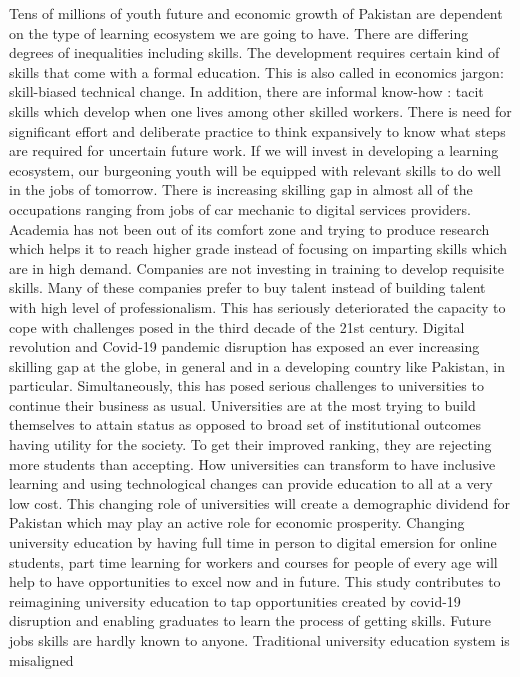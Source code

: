\documentclass[]{elsarticle} %
\begin{document}
Tens of millions of youth future and economic growth of Pakistan are
dependent on the type of learning ecosystem we are going to have. There
are differing degrees of inequalities including skills. The development
requires certain kind of skills that come with a formal education. This
is also called in economics jargon: skill-biased technical change. In
addition, there are informal know-how : tacit skills which develop when
one lives among other skilled workers. There is need for significant
effort and deliberate practice to think expansively to know what steps
are required for uncertain future work. If we will invest in developing
a learning ecosystem, our burgeoning youth will be equipped with
relevant skills to do well in the jobs of tomorrow. There is increasing
skilling gap in almost all of the occupations ranging from jobs of car
mechanic to digital services providers. Academia has not been out of its
comfort zone and trying to produce research which helps it to reach
higher grade instead of focusing on imparting skills which are in high
demand. Companies are not investing in training to develop requisite
skills. Many of these companies prefer to buy talent instead of building
talent with high level of professionalism. This has seriously
deteriorated the capacity to cope with challenges posed in the third
decade of the 21st century. Digital revolution and Covid-19 pandemic
disruption has exposed an ever increasing skilling gap at the globe, in
general and in a developing country like Pakistan, in particular.
Simultaneously, this has posed serious challenges to universities to
continue their business as usual. Universities are at the most trying to
build themselves to attain status as opposed to broad set of
institutional outcomes having utility for the society. To get their
improved ranking, they are rejecting more students than accepting. How
universities can transform to have inclusive learning and using
technological changes can provide education to all at a very low cost.
This changing role of universities will create a demographic dividend
for Pakistan which may play an active role for economic prosperity.
Changing university education by having full time in person to digital
emersion for online students, part time learning for workers and courses
for people of every age will help to have opportunities to excel now and
in future. This study contributes to reimagining university education to
tap opportunities created by covid-19 disruption and enabling graduates
to learn the process of getting skills. Future jobs skills are hardly
known to anyone. Traditional university education system is misaligned
\end{document}
